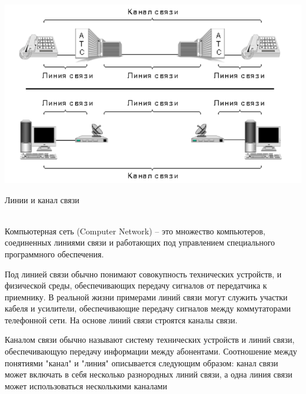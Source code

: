 \documentclass[a4paper,14pt]{extarticle}
\begin{document}
\centering

\includegraphics[width=0.8\linewidth]{n1.png}
\newline
\caption{Линии и канал связи}\\

Компьютерная сеть (Computer Network) – это множество компьютеров, соединенных линиями связи и работающих под управлением специального программного обеспечения.

Под линией связи обычно понимают совокупность технических устройств, и физической среды, обеспечивающих передачу сигналов от передатчика к приемнику. В реальной жизни примерами линий связи могут служить участки кабеля и усилители, обеспечивающие передачу сигналов между коммутаторами телефонной сети. На основе линий связи строятся каналы связи.

Каналом связи обычно называют систему технических устройств и линий связи, обеспечивающую передачу информации между абонентами. Соотношение между понятиями "канал" и "линия" описывается следующим образом: канал связи может включать в себя несколько разнородных линий связи, а одна линия связи может использоваться несколькими каналами
\end{document}
